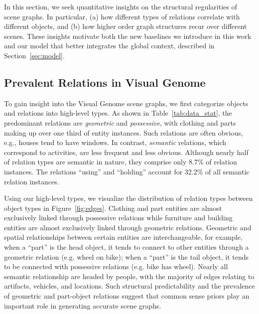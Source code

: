 \documentclass[10pt,twocolumn,letterpaper]{article}
\newcommand{\term}[1]{\emph{#1}}  %
\begin{document}
In this section, we seek quantitative insights on the structural regularities of scene graphs. In particular, (a) how different types of relations correlate with different objects, and (b) how higher order graph structures recur over different scenes. These insights motivate both the new baselines we introduce in this work and our model that better integrates the global context, described in  Section~\ref{sec:model}.

\subsection{Prevalent Relations in Visual Genome}
To gain insight into the Visual Genome scene graphs, we first categorize objects and relations into high-level types.
As shown in  Table~\ref{tab:data_stat}, the predominant relations are \term{geometric} and \term{possessive}, with clothing and parts making up over one third of entity instances.
Such relations are often obvious, e.g., houses tend to have windows.
In contrast, \term{semantic} relations, which correspond to activities, are less frequent and less obvious.
Although nearly half of relation types are semantic in nature, they comprise only 8.7\% of relation instances.
The relations ``using'' and ``holding''  account for 32.2\% of all semantic relation instances.

Using our high-level types, we visualize the distribution of relation types between object types in Figure~\ref{fig:edges}.
Clothing and part entities are almost exclusively linked through possessive relations while furniture and building entities are almost exclusively linked through geometric relations.
Geometric and spatial relationships between certain entities are interchangeable, for example,
when a ``part'' is the head object, it tends to connect to other entities through a geometric relation (e.g. wheel on bike); when a ``part'' is the tail object, it tends to be connected with possessive relations (e.g. bike has wheel).
Nearly all semantic relationship are headed by people, with the majority of edges relating to artifacts, vehicles, and locations.
Such structural predictability and the prevalence of geometric and part-object relations suggest that common sense priors play an important role in generating accurate scene graphs.
\end{document}
